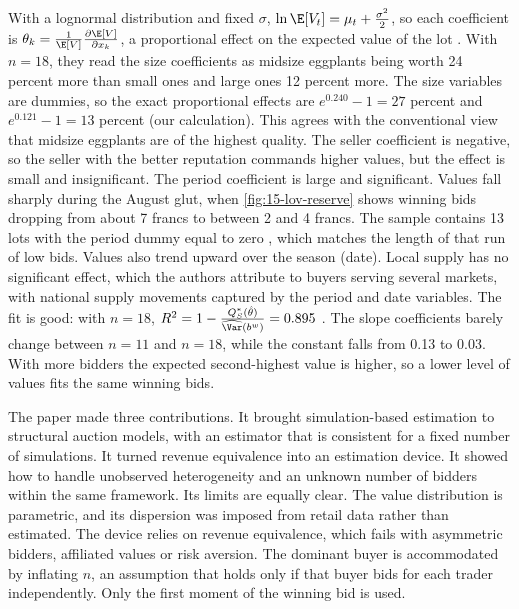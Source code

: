 With a lognormal distribution and fixed $\sigma$, $\ln\E[V_t]=\mu_t+\frac{\sigma^2}{2}$, so each coefficient is
$\theta_k=\frac{1}{\E[V]}\frac{\partial\E[V]}{\partial x_k}$, a proportional effect on the expected value of the lot
\citep[p.~970]{LaffontOssardVuong1995}. With $n=18$, they read the size coefficients as midsize eggplants being worth
24 percent more than small ones and large ones 12 percent more. The size variables are dummies, so the exact
proportional effects are $e^{0.240}-1=27$ percent and $e^{0.121}-1=13$ percent (our calculation). This agrees with the conventional view that midsize eggplants are of the highest
quality. The seller coefficient is negative, so the seller with the better reputation commands higher values, but
the effect is small and insignificant. The period coefficient is large and significant. Values fall sharply during
the August glut, when \cref{fig:15-lov-reserve} shows winning bids dropping from about 7 francs to between 2 and 4
francs. The sample contains 13 lots with the period dummy equal to zero \citep[Appendix~B]{LaffontOssardVuong1995},
which matches the length of that run of low bids. Values also trend upward over the season (date). Local supply has no
significant effect, which the authors attribute to buyers serving several markets, with national supply movements
captured by the period and date variables. The fit is good: with $n=18$, $R^2=1-\frac{Q_S^*(\hat\theta)}{\widehat\Var(b^w)}=0.895$
\citep[p.~971]{LaffontOssardVuong1995}. The slope coefficients barely change between $n=11$ and $n=18$, while the
constant falls from 0.13 to 0.03. With more bidders the expected second-highest value is higher, so a lower level of
values fits the same winning bids.

The paper made three contributions. It brought simulation-based estimation to structural auction models, with an
estimator that is consistent for a fixed number of simulations. It turned revenue equivalence into an estimation device. It
showed how to handle unobserved heterogeneity and an unknown number of bidders within the same framework. Its limits
are equally clear. The value distribution is parametric, and its dispersion was imposed from retail data rather than
estimated. The device relies on revenue equivalence, which fails with asymmetric bidders, affiliated values or risk
aversion. The dominant buyer is accommodated by inflating $n$, an assumption that holds only if that buyer bids for
each trader independently. Only the first moment of the winning bid is used.


